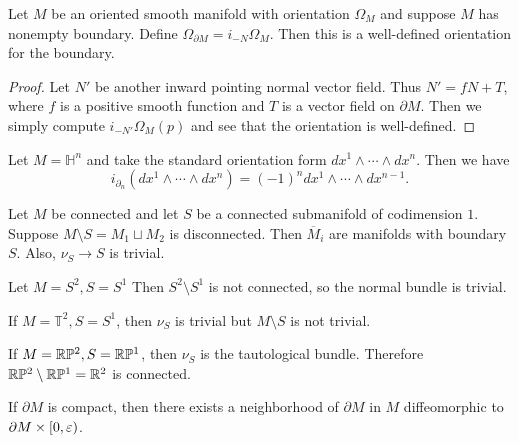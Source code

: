 \documentclass[twoside, 10pt]{article}
\renewcommand{\H}{\mathbb{H}}
\begin{document}
    \begin{prop}
        Let $M$ be an oriented smooth manifold with orientation $\Omega_M$ and suppose $M$ has nonempty boundary. Define $\Omega_{\partial M} = i_{-N}\Omega_M$. Then this is a well-defined orientation for the boundary.
    \end{prop}

    \begin{proof}
        Let $N'$ be another inward pointing normal vector field. Thus $N' = fN + T$, where $f$ is a positive smooth function and $T$ is a vector field on $\partial M$. Then we simply compute $i_{-N'}\Omega_M(p)$ and see that the orientation is well-defined.
    \end{proof}

    \begin{exm}
        Let $M = \H^n$ and take the standard orientation form $dx^1 \wedge \cdots \wedge dx^n$. Then we have
        \[ i_{\partial_n}(dx^1 \wedge \cdots \wedge dx^n) = (-1)^n dx^1 \wedge \cdots \wedge dx^{n-1}.\]
    \end{exm}

    \begin{lem}
        Let $M$ be connected and let $S$ be a connected submanifold of codimension $1$. Suppose $M \setminus S = M_1 \sqcup M_2$ is disconnected. Then $\overline{M}_i$ are manifolds with boundary $S$. Also, $\nu_S \to S$ is trivial.
    \end{lem}

    \begin{exm}
        Let $M = S^2, S = S^1$ Then $S^2 \setminus S^1$ is not connected, so the normal bundle is trivial.
    \end{exm}

    \begin{exm}
        If $M = \mathbb{T}^2, S = S^1$, then $\nu_S$ is trivial but $M \setminus S$ is not trivial.
    \end{exm}

    \begin{exm}
        If $M = \mathbb{R}\mathbb{P}^2, S = \mathbb{R}\mathbb{P}^1$, then $\nu_S$ is the tautological bundle. Therefore $\mathbb{R}\mathbb{P}^2 \setminus \mathbb{R}\mathbb{P}^1 = \mathbb{R}^2$ is connected.
    \end{exm}

    \begin{thm}
        If $\partial M$ is compact, then there exists a neighborhood of $\partial M$ in $M$ diffeomorphic to $\partial M \times [0,\varepsilon)$.
    \end{thm}
\end{document}
